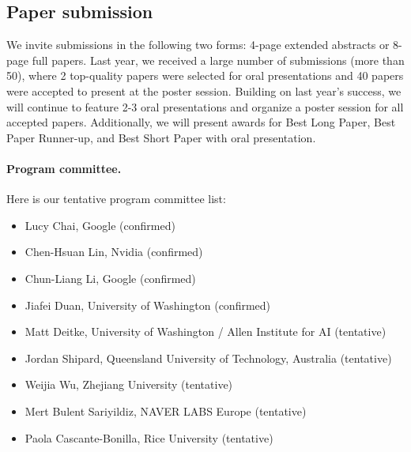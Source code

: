 \documentclass{article}
\begin{document}
\subsection{Paper submission}
We invite submissions in the following two forms: 4-page extended abstracts or 8-page full papers. Last year, we received a large number of submissions (more than 50), where 2 top-quality papers were selected for oral presentations and 40 papers were accepted to present at the poster session. Building on last year’s success, we will continue to feature 2-3 oral presentations and organize a poster session for all accepted papers. Additionally, we will present awards for Best Long Paper, Best Paper Runner-up, and Best Short Paper with oral presentation.


\paragraph{Program committee.}
Here is our tentative program committee list:
\begin{itemize}
    \item Lucy Chai, Google (confirmed)
    \item Chen-Hsuan Lin,  Nvidia (confirmed)
    \item Chun-Liang Li, Google (confirmed)
    \item Jiafei Duan, University of Washington (confirmed)
    \item Matt Deitke, University of Washington / Allen Institute for AI (tentative)
    \item Jordan Shipard, Queensland University of Technology, Australia (tentative)
    \item Weijia Wu, Zhejiang University (tentative)
    \item Mert Bulent Sariyildiz, NAVER LABS Europe (tentative)
    \item Paola Cascante-Bonilla, Rice University (tentative)
    

\end{itemize}
\end{document}
